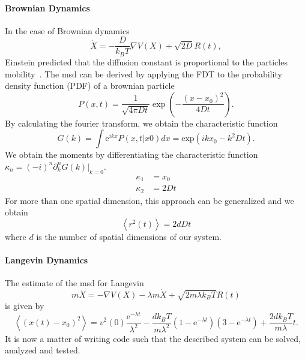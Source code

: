 \documentclass[a4paper]{article}
\begin{document}
\paragraph{Brownian Dynamics}
In the case of Brownian dynamics~\cite{Brown1828}
\begin{equation}
    \dot{X} = -\frac{D}{k_B T} \nabla V(X) + \sqrt{2D}R(t),
\end{equation}
Einstein predicted that the diffusion constant is proportional to the particles
mobility~\cite{Einstein1905}.
The \ac{msd} can be derived by applying the FDT to the probability density function (PDF) of a
brownian particle
\begin{equation}
    P(x,t) = \frac{1}{\sqrt{4\pi D t}}\exp\left(-\frac{(x-x_0)^2}{4Dt}\right).
\end{equation}
By calculating the fourier transform, we obtain the characteristic function
\begin{equation}
    G(k) = \int \text{e}^{ikx} P(x,t|x0)dx = \text{exp}(ikx_0 - k^2Dt).
\end{equation}
We obtain the moments by differentiating the characteristic function
$\kappa_n = (-i)^n\partial_k^n G(k)|_{k=0}$.
\begin{align}
    \kappa_1 &= x_0\\
    \kappa_2 &= 2Dt
\end{align}
For more than one spatial dimension, this approach can be generalized and we obtain
\begin{equation}
    \left<r^2(t)\right> = 2d D t
\end{equation}
where $d$ is the number of spatial dimensions of our system.

\paragraph{Langevin Dynamics}
The estimate of the \ac{msd} for Langevin~\cite{Lemons1997}
\begin{equation}
    m \ddot{X} = - \nabla V(X) - \lambda m \dot{X} + \sqrt{2m\lambda k_B T}R(t)
\end{equation}
is given by~\cite{VANKAMPEN2007}
\begin{equation}
    \left<(x(t)-x_0)^2\right> =
        v^2(0) \frac{\text{e}^{-\lambda t}}{\lambda^2}
        - \frac{d k_B T}{m\lambda^2}
            \left(1-\text{e}^{-\lambda t}\right)
            \left(3 - \text{e}^{-\lambda t}\right)
        + \frac{2 d k_B T}{m\lambda}t.
\end{equation}
It is now a matter of writing code such that the described system can be solved, analyzed and
tested.
\end{document}
